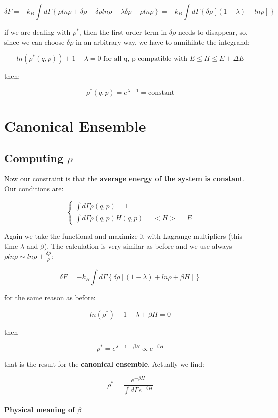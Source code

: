 \documentclass[a4paper, italian, openany]{book}
\begin{document}
$$\delta F = - k_B \int d\Gamma \left \{ \rho ln\rho + \delta \rho + \delta \rho ln \rho - \lambda \delta \rho - \rho ln \rho \right \} = -k_B \int d\Gamma \left \{ \delta \rho [(1-\lambda) + ln \rho ] \right \}$$

if we are dealing with $\rho^*$, then the first order term in $\delta \rho$ needs to disappear, so, since we can choose $\delta \rho$ in an arbitrary way, we have to annihilate the integrand:

$$ln(\rho^*(q, p)) + 1-\lambda = 0 \mbox{ for all q, p compatible with } E \le H \le E+ \Delta E$$

then:

$$\rho^*(q, p) = e^{\lambda -1} = \mbox{constant}$$

\section{Canonical Ensemble}

\subsection{Computing $\rho$}

Now our constraint is that the \textbf{average energy of the system is constant}. Our conditions are:

$$\begin{cases}
\int d\Gamma \rho(q, p) = 1\\
\int d\Gamma \rho(q, p) H(q, p) = <H> = \bar{E}
\end{cases}
$$

Again we take the functional and maximize it with Lagrange multipliers (this time $\lambda$ and $\beta$). The calculation is very similar as before and we use always $\rho ln \rho \sim ln\rho + \frac{\delta \rho}{\rho}$:

$$\delta F = -k_B \int d\Gamma \left \{ \delta \rho [(1-\lambda) + ln \rho + \beta H] \right \}$$

for the same reason as before:

$$ln(\rho^*) + 1 - \lambda + \beta H = 0$$

then

$$\rho^* = e^{\lambda -1 -\beta H} \propto e^{-\beta H}$$

that is the result for the \textbf{canonical ensemble}. Actually we find:

$$\rho^* = \frac{e^{-\beta H}}{\int d\Gamma e^{-\beta H}}$$

\paragraph{Physical meaning of $\beta$}
\end{document}
